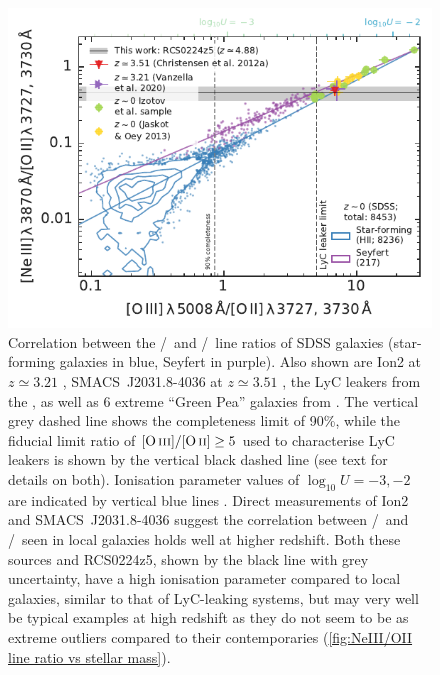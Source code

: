 \begin{figure}
    \centering
    \includegraphics[width=\linewidth]{"Plots/Chapter2/SDSS_NeIII-OII_vs_OIII-OII_DR7"}
    \caption[Correlation between the \NeIII/\OII\ and \OIIIf/\OII\ line ratios of SDSS galaxies]{Correlation between the \NeIII/\OII\ and \OIIIf/\OII\ line ratios of SDSS galaxies (star-forming galaxies in blue, Seyfert in purple). Also shown are Ion2 at $z \simeq 3.21$ \citep{2020MNRAS.491.1093V}, SMACS~J2031.8-4036 at $z \simeq 3.51$ \citep{2012MNRAS.427.1953C}, the LyC leakers from the \Isample, as well as $6$ extreme ``Green Pea'' galaxies from \citet{2013ApJ...766...91J}. The vertical grey dashed line shows the completeness limit of 90\%, while the fiducial limit ratio of $\OIIIf/\OII \geq 5$ used to characterise LyC leakers is shown by the vertical black dashed line (see text for details on both). Ionisation parameter values of $\log_{10} U = -3, -2$ are indicated by vertical blue lines \citep[see \cref{eq:OIII/OII logU diagnostic}, derived by][]{2000MNRAS.318..462D}. Direct measurements of Ion2 and SMACS~J2031.8-4036 suggest the correlation between \NeIII/\OII\ and \OIIIf/\OII\ seen in local galaxies holds well at higher redshift. Both these sources and RCS0224z5, shown by the black line with grey uncertainty, have a high ionisation parameter compared to local galaxies, similar to that of LyC-leaking systems, but may very well be typical examples at high redshift as they do not seem to be as extreme outliers compared to their contemporaries (\cref{fig:NeIII/OII line ratio vs stellar mass}).}
    \label{fig:NeIII/OII vs OIII/OII line ratios}
\end{figure}

